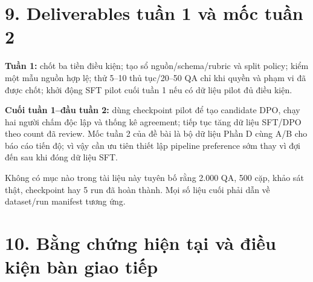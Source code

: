 \documentclass[11pt,a4paper]{article}
\begin{document}
\section{9. Deliverables tuần 1 và mốc tuần
2}\label{deliverables-tuux1ea7n-1-vuxe0-mux1ed1c-tuux1ea7n-2}

\textbf{Tuần 1:} chốt ba tiền điều kiện; tạo sổ nguồn/schema/rubric và
split policy; kiểm một mẫu nguồn hợp lệ; thử 5--10 thủ tục/20--50 QA chỉ
khi quyền và phạm vi đã được chốt; khởi động SFT pilot cuối tuần 1 nếu
có dữ liệu pilot đủ điều kiện.

\textbf{Cuối tuần 1--đầu tuần 2:} dùng checkpoint pilot để tạo candidate
DPO, chạy hai người chấm độc lập và thống kê agreement; tiếp tục tăng dữ
liệu SFT/DPO theo count đã review. Mốc tuần 2 của đề bài là bộ dữ liệu
Phần D cùng A/B cho báo cáo tiến độ; vì vậy cần ưu tiên thiết lập
pipeline preference sớm thay vì đợi đến sau khi đóng dữ liệu SFT.

Không có mục nào trong tài liệu này tuyên bố rằng 2.000 QA, 500 cặp,
khảo sát thật, checkpoint hay 5 run đã hoàn thành. Mọi số liệu cuối phải
dẫn về dataset/run manifest tương ứng.

\section{10. Bằng chứng hiện tại và điều kiện bàn giao
tiếp}\label{bux1eb1ng-chux1ee9ng-hiux1ec7n-tux1ea1i-vuxe0-ux111iux1ec1u-kiux1ec7n-buxe0n-giao-tiux1ebfp}
\end{document}
